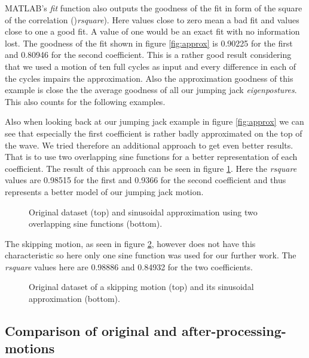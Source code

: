 \documentclass[a4paper]{article}
\begin{document}
MATLAB's \emph{fit} function also outputs the goodness of the fit in form of the square of the correlation ()\emph{rsquare}).
Here values close to zero mean a bad fit and values close to one a good fit.
A value of one would be an exact fit with no information lost.
The goodness of the fit shown in figure \ref{fig:approx} is 0.90225 for the first and 0.80946 for the second coefficient.
This is a rather good result considering that we used a motion of ten full cycles as input and every difference in each of the cycles impairs the approximation.
Also the approximation goodness of this example is close the the average goodness of all our jumping jack \emph{eigenpostures}.
This also counts for the following examples.

Also when looking back at our jumping jack example in figure \ref{fig:approx} we can see that especially the first coefficient is rather badly approximated on the top of the wave.
We tried therefore an additional approach to get even better results. That is to use two overlapping sine functions for a better representation of each coefficient.
The result of this approach can be seen in figure \ref{fig:approx2}.
Here the \emph{rsquare} values are 0.98515 for the first and 0.9366 for the second coefficient and thus represents a better model of our jumping jack motion.

\begin{figure}[htb]
		\centering
		\caption{Original dataset (top) and sinusoidal approximation using two overlapping sine functions (bottom).}
		\label{fig:approx2}
\end{figure}

The skipping motion, as seen in figure \ref{fig:approx3}, however does not have this characteristic so here only one sine function was used for our further work.
The \emph{rsquare} values here are 0.98886 and 0.84932 for the two coefficients.

\begin{figure}[htb]
		\centering
		\caption{Original dataset of a skipping motion (top) and its sinusoidal approximation (bottom).}
		\label{fig:approx3}
\end{figure}


\subsection{Comparison of original and after-processing-motions}

\end{document}
